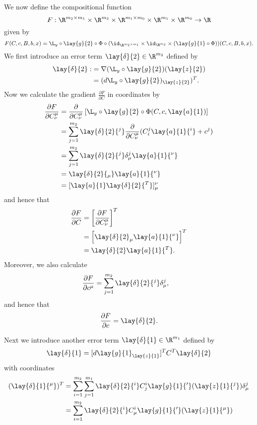 We now define the compositional function
$$F:\R^{m_2\times m_1}\times \R^{m_2}\times \R^{m_1\times m_0}\times \R^{m_1}\times \R^{m_0}\to\R$$
given by
$$F(C,c,B,b,x)=\L_y\circ\lay{g}{2}\circ\Phi\circ(\id_{\R^{m_2\times m_1}}\times\id_{\R^{m_2}}\times (\lay{g}{1}\circ\Phi))(C,c,B,b,x).$$
We first introduce an error term $\lay{\delta}{2}\in\R^{m_2}$ defined by
\begin{align*}
	\lay{\delta}{2}:&=\nabla (\L_y\circ\lay{g}{2})(\lay{z}{2})\\
	&=(d\L_y\circ\lay{g}{2})_{\lay{z}{2}})^T.
\end{align*}
Now we calculate the gradient $\frac{\partial F}{\partial C}$ in coordinates by
\begin{align*}
	\frac{\partial F}{\partial C^\mu_\nu}&=\frac{\partial}{\partial C^\mu_\nu}\left[\L_y\circ\lay{g}{2}\circ\Phi(C,c,\lay{a}{1})\right]\\
	&=\sum_{j=1}^{m_2}\lay{\delta}{2}{^j}\frac{\partial}{\partial C^\mu_\nu}(C^j_i\lay{a}{1}{^i}+c^j)\\
	&=\sum_{j=1}^{m_2}\lay{\delta}{2}{^j}\delta^j_\mu \lay{a}{1}{^\nu}\\
	&=\lay{\delta}{2}{_\mu}\lay{a}{1}{^\nu}\\
	&=[\lay{a}{1}\lay{\delta}{2}{^T}]_\mu^\nu
\end{align*}
and hence that
\begin{align*}
	\frac{\partial F}{\partial C}&=\left[
		\frac{\partial F}{\partial C^\mu_\nu}
	\right]^T\\
	&=\left[\lay{\delta}{2}_\mu \lay{a}{1}{^\nu}\right]^T\\
	&=\lay{\delta}{2}\lay{a}{1}{^T}.
\end{align*}
Moreover, we also calculate
\begin{align*}
	\frac{\partial F}{\partial c^\mu}&=\sum_{j=1}^{m_2}\lay{\delta}{2}{^j}\delta^j_\mu,
\end{align*}
and hence that
$$\frac{\partial F}{\partial c}=\lay{\delta}{2}.$$

Next we introduce another error term $\lay{\delta}{1}\in\R^{m_1}$ defined by
\begin{align*}
	\lay{\delta}{1}=[d\lay{g}{1}_{\lay{z}{1}}]^TC^T\lay{\delta}{2}
\end{align*}
with coordinates
\begin{align*}
	(\lay{\delta}{1}{^\mu})^T&=\sum_{i=1}^{m_2}\sum_{j=1}^{m_1}\lay{\delta}{2}{^i}C^i_j\lay{g}{1}{'}(\lay{z}{1}{^j})\delta^j_\mu\\
	&=\sum_{i=1}^{m_2}\lay{\delta}{2}{^i}C^i_\mu\lay{g}{1}{'}(\lay{z}{1}{^\mu})
\end{align*}

